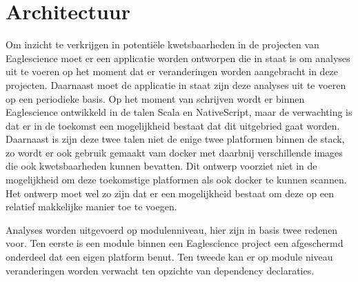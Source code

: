 \chapter{Architectuur}\label{ch:Architectuur}

Om inzicht te verkrijgen in potentiële kwetsbaarheden in de projecten van Eaglescience moet er een applicatie worden ontworpen die in staat is om analyses uit te voeren op het moment dat er veranderingen worden aangebracht in deze projecten. Daarnaast moet de applicatie in staat zijn deze analyses uit te voeren op een periodieke basis.
Op het moment van schrijven wordt er binnen Eaglescience ontwikkeld in de talen Scala en NativeScript, maar de verwachting is dat er in de toekomst een mogelijkheid bestaat dat dit uitgebried gaat worden. Daarnaast is zijn deze twee talen niet de enige twee platformen binnen de stack, zo wordt er ook gebruik gemaakt vam docker met daarbnij verschillende images die ook kwetsbaarheden kunnen bevatten. Dit ontwerp voorziet niet in de mogelijkheid om deze toekomstige platformen als ook docker te kunnen scannen. Het ontwerp moet wel zo zijn dat er een mogelijkheid bestaat om deze op een relatief makkelijke manier toe te voegen.

Analyses worden uitgevoerd op modulenniveau, hier zijn in basis twee redenen voor. Ten eerste is een module binnen een Eaglescience project een afgeschermd onderdeel dat een eigen platform benut. Ten tweede kan er op module niveau veranderingen worden verwacht ten opzichte van dependency declaraties.

